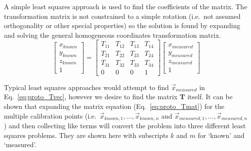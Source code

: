 A simple least squares approach is used to find the coefficients of the matrix. %
The transformation matrix is not constrained to a simple rotation (i.e.\ not assumed orthogonality or other special properties) so the solution is found by expanding and solving the general homogeneous coordinates transformation matrix.
\begin{equation}
    \begin{bmatrix}
        x_{known} \\
        y_{known} \\
        z_{known} \\
        1
    \end{bmatrix} =
    \begin{bmatrix}
        T_{11} & T_{12} & T_{13} &T_{14} \\
        T_{21} & T_{22} & T_{23} &T_{24} \\
        T_{31} & T_{32} & T_{33} &T_{34} \\
        0 & 0 & 0 & 1
    \end{bmatrix}
    \begin{bmatrix}
        x_{measured} \\
        y_{measured} \\
        z_{measured} \\
        1
    \end{bmatrix}
    \label{eq:proto_Tmat}
\end{equation}

Typical least squares approaches would attempt to find $\vec{x}_{measured}$ in Eq.~\ref{eq:proto_Tvec}, however we desire to find the matrix $\mathbf{T}$ itself.
It can be shown that expanding the matrix equation (Eq.~\ref{eq:proto_Tmat}) for the multiple calibration points (i.e.\ $\vec{x}_{known,1},\dots,\vec{x}_{known,n}$ and $\vec{x}_{measured,1},\dots,\vec{x}_{measured,n}$) and then collecting like terms will convert the problem into three different least squares problems.
They are shown here with subscripts $k$ and $m$ for `known' and `measured'.

